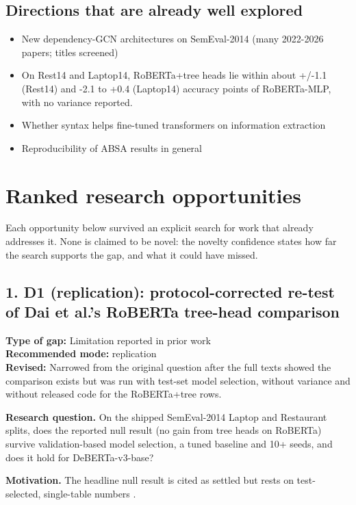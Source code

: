 \documentclass[11pt,a4paper]{article}
\begin{document}
\subsection{Directions that are already well explored}

\begin{itemize}
\item [E] New dependency-GCN architectures on SemEval-2014 (many 2022-2026 papers; titles screened) \cite{li2024sebert,zhao2023rdgcn}
\item [V] On Rest14 and Laptop14, RoBERTa+tree heads lie within about +/-1.1 (Rest14) and -2.1 to +0.4 (Laptop14) accuracy points of RoBERTa-MLP, with no variance reported. \cite{dai2021syntax}
\item [V] Whether syntax helps fine-tuned transformers on information extraction \cite{sachan2021syntax}
\item [V] Reproducibility of ABSA results in general \cite{mukherjee2021repro}
\end{itemize}

\section{Ranked research opportunities}

Each opportunity below survived an explicit search for work that already addresses it. None is claimed to be novel: the novelty confidence states how far the search supports the gap, and what it could have missed.

\subsection{1. D1 (replication): protocol-corrected re-test of Dai et al.'s RoBERTa tree-head comparison}
\textbf{Type of gap:} Limitation reported in prior work\\
\textbf{Recommended mode:} replication\\
\textbf{Revised:} Narrowed from the original question after the full texts showed the comparison exists but was run with test-set model selection, without variance and without released code for the RoBERTa+tree rows.

\textbf{Research question.} On the shipped SemEval-2014 Laptop and Restaurant splits, does the reported null result (no gain from tree heads on RoBERTa) survive validation-based model selection, a tuned baseline and 10+ seeds, and does it hold for DeBERTa-v3-base?

\textbf{Motivation.} The headline null result is cited as settled but rests on test-selected, single-table numbers \cite{dai2021syntax}.
\end{document}
